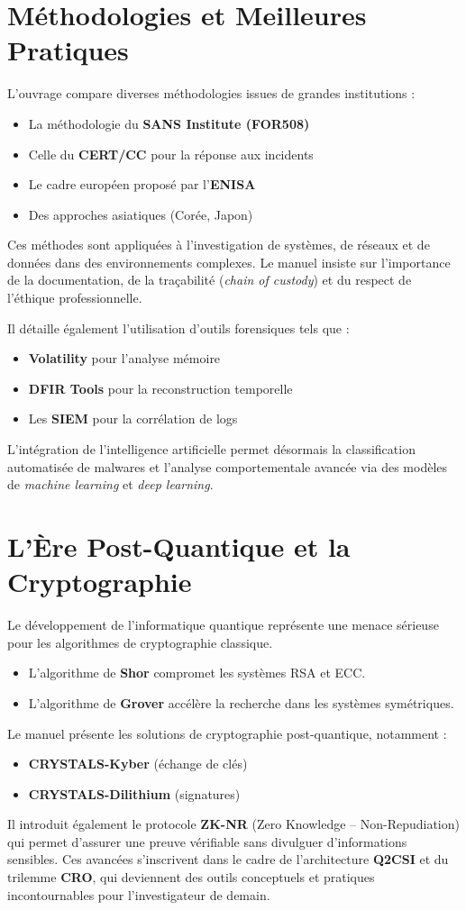 \documentclass[12pt,a4paper]{article}
\begin{document}
\section{\centering \huge Méthodologies et Meilleures Pratiques}
{\Large L’ouvrage compare diverses méthodologies issues de grandes institutions :
\begin{itemize}
	\item La méthodologie du \textbf{SANS Institute (FOR508)}
	\item Celle du \textbf{CERT/CC} pour la réponse aux incidents
	\item Le cadre européen proposé par l’\textbf{ENISA}
	\item Des approches asiatiques (Corée, Japon)
\end{itemize}}
{\Large Ces méthodes sont appliquées à l’investigation de systèmes, de réseaux et de données dans des environnements complexes. Le manuel insiste sur l’importance de la documentation, de la traçabilité (\textit{chain of custody}) et du respect de l’éthique professionnelle.}

Il détaille également l’utilisation d’outils forensiques tels que :
\begin{itemize}
	\item \textbf{Volatility} pour l’analyse mémoire
	\item \textbf{DFIR Tools} pour la reconstruction temporelle
	\item Les \textbf{SIEM} pour la corrélation de logs
\end{itemize}
{\Large L’intégration de l’intelligence artificielle permet désormais la classification automatisée de malwares et l’analyse comportementale avancée via des modèles de \textit{machine learning} et \textit{deep learning}.}

\section{\centering \huge L’Ère Post-Quantique et la Cryptographie}
{\Large Le développement de l’informatique quantique représente une menace sérieuse pour les algorithmes de cryptographie classique.
\begin{itemize}
	\item L’algorithme de \textbf{Shor} compromet les systèmes RSA et ECC.
	\item L’algorithme de \textbf{Grover} accélère la recherche dans les systèmes symétriques.
\end{itemize}
Le manuel présente les solutions de cryptographie post-quantique, notamment :
\begin{itemize}
	\item \textbf{CRYSTALS-Kyber} (échange de clés)
	\item \textbf{CRYSTALS-Dilithium} (signatures)
\end{itemize}
Il introduit également le protocole \textbf{ZK-NR} (Zero Knowledge – Non-Repudiation) qui permet d’assurer une preuve vérifiable sans divulguer d’informations sensibles. Ces avancées s’inscrivent dans le cadre de l’architecture \textbf{Q2CSI} et du trilemme \textbf{CRO}, qui deviennent des outils conceptuels et pratiques incontournables pour l’investigateur de demain.}
\end{document}
